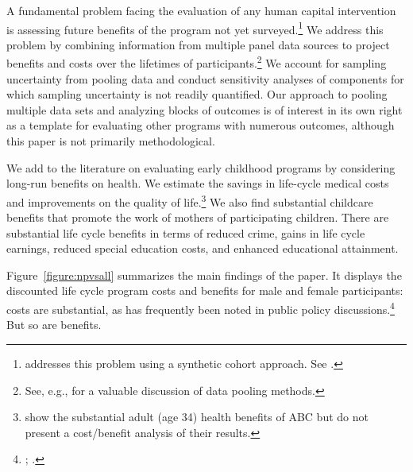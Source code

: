 A fundamental problem facing the evaluation of any human capital intervention is assessing future benefits of the program not yet surveyed.\footnote{\cite{Mincer_1974_schooling} addresses this problem using a synthetic cohort approach. See \cite{Heckman_Lochner_ea_2006_HEE}.} We address this problem by combining information from multiple panel data sources to project benefits and costs over the lifetimes of participants.\footnote{See, e.g., \citet{Ridder_Moffitt_2007_hbk_metricsdata} for a valuable discussion of data pooling methods.} We account for sampling uncertainty from pooling data and conduct sensitivity analyses of components for which sampling uncertainty is not readily quantified. Our approach to pooling multiple data sets and analyzing blocks of outcomes is of interest in its own right as a template for evaluating other programs with numerous outcomes, although this paper is not primarily methodological.

We add to the literature on evaluating early childhood programs by considering long-run benefits on health. We estimate the savings in life-cycle medical costs and improvements on the quality of life.\footnote{\cite{Campbell_Conti_etal_2014_EarlyChildhoodInvestments} show the substantial adult (age 34) health benefits of ABC but do not present a cost/benefit analysis of their results.} We also find substantial childcare benefits that promote the work of mothers of participating children. There are substantial life cycle benefits in terms of reduced crime, gains in life cycle earnings, reduced special education costs, and enhanced educational attainment.

Figure~\ref{figure:npvsall} summarizes the main findings of the paper. It displays the discounted life cycle program costs and benefits for male and female participants: costs are substantial, as has frequently been noted in public policy discussions.\footnote{\cite{Whitehurst_2014_Senate_Testimony}; \cite{Fox_News_2014_Head_Start_Effects}.} But so are benefits.

